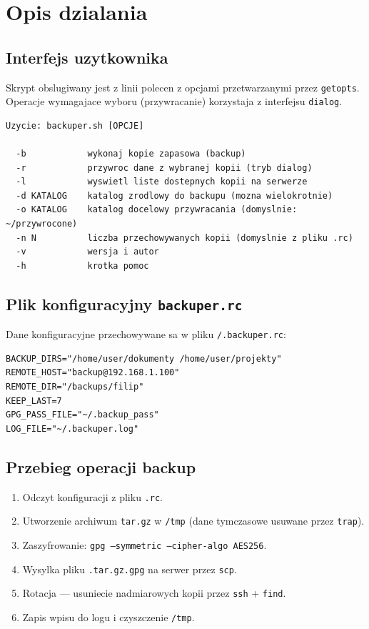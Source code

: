 \documentclass[a4paper,12pt]{article}
\begin{document}
\section{Opis dzialania}

\subsection{Interfejs uzytkownika}

Skrypt obslugiwany jest z linii polecen z opcjami przetwarzanymi przez \texttt{getopts}.
Operacje wymagajace wyboru (przywracanie) korzystaja z interfejsu \texttt{dialog}.

\begin{lstlisting}
Uzycie: backuper.sh [OPCJE]

  -b            wykonaj kopie zapasowa (backup)
  -r            przywroc dane z wybranej kopii (tryb dialog)
  -l            wyswietl liste dostepnych kopii na serwerze
  -d KATALOG    katalog zrodlowy do backupu (mozna wielokrotnie)
  -o KATALOG    katalog docelowy przywracania (domyslnie: ~/przywrocone)
  -n N          liczba przechowywanych kopii (domyslnie z pliku .rc)
  -v            wersja i autor
  -h            krotka pomoc
\end{lstlisting}

\subsection{Plik konfiguracyjny \texttt{backuper.rc}}

Dane konfiguracyjne przechowywane sa w pliku \texttt{/.backuper.rc}:

\begin{lstlisting}
BACKUP_DIRS="/home/user/dokumenty /home/user/projekty"
REMOTE_HOST="backup@192.168.1.100"
REMOTE_DIR="/backups/filip"
KEEP_LAST=7
GPG_PASS_FILE="~/.backup_pass"
LOG_FILE="~/.backuper.log"
\end{lstlisting}

\subsection{Przebieg operacji backup}

\begin{enumerate}[leftmargin=1.5em, itemsep=1pt, topsep=2pt]
  \item Odczyt konfiguracji z pliku \texttt{.rc}.
  \item Utworzenie archiwum \texttt{tar.gz} w \texttt{/tmp} (dane tymczasowe usuwane przez \texttt{trap}).
  \item Zaszyfrowanie: \texttt{gpg --symmetric --cipher-algo AES256}.
  \item Wysylka pliku \texttt{.tar.gz.gpg} na serwer przez \texttt{scp}.
  \item Rotacja --- usuniecie nadmiarowych kopii przez \texttt{ssh} + \texttt{find}.
  \item Zapis wpisu do logu i czyszczenie \texttt{/tmp}.
\end{enumerate}
\end{document}

